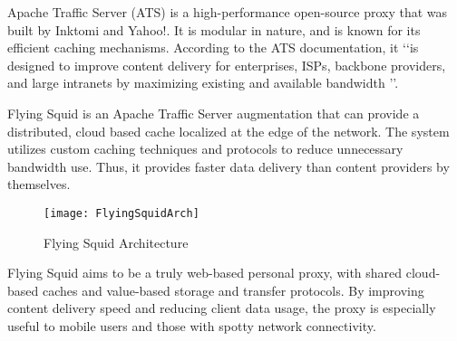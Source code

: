 Apache Traffic Server (ATS) is a high-performance open-source proxy that was built by Inktomi and Yahoo!. It is modular in nature, and is known for its efficient caching mechanisms. According to the ATS documentation, it \lq \lq is designed to improve content delivery for enterprises, ISPs, backbone providers, and large intranets by maximizing existing and available bandwidth \rq \rq \cite{ATS}.

Flying Squid is an Apache Traffic Server augmentation that can provide a distributed, cloud based cache localized at the edge of the network. The system utilizes custom caching techniques and protocols to reduce unnecessary bandwidth use. Thus, it provides faster data delivery than content providers by themselves. 

\begin{figure}[H] \centering
\texttt{[image: FlyingSquidArch]}
\caption{Flying Squid Architecture}
\end{figure}


Flying Squid aims to be a truly web-based personal proxy, with shared cloud-based caches and value-based storage and transfer protocols. By improving content delivery speed and reducing client data usage, the proxy is especially useful to mobile users and those with spotty network connectivity.